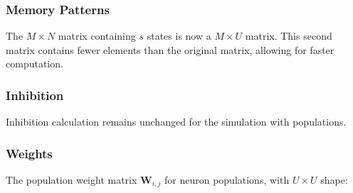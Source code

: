 

\subsubsection{Memory Patterns}

The \(M \times N\) matrix containing \(s\) states is now a \(M \times U\) matrix.
This second matrix contains fewer elements than the original matrix, allowing for faster computation.


\subsubsection{Inhibition}

Inhibition calculation remains unchanged for the simulation with populations.


\subsubsection{Weights}


    The population weight matrix \(\boldsymbol{W}_{i, j}\) for neuron populations, with \(U \times U\) shape:

